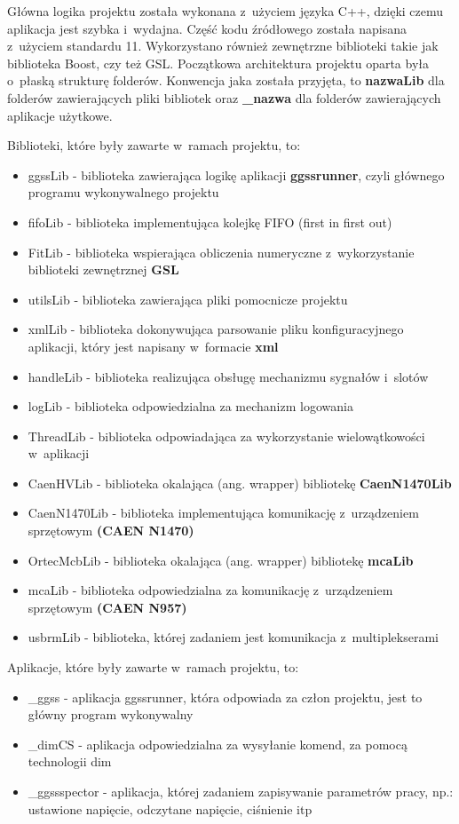 Główna logika projektu została wykonana z~użyciem języka C++, dzięki czemu aplikacja jest szybka i~wydajna. Część kodu źródłowego została napisana z~użyciem standardu 11. Wykorzystano również zewnętrzne biblioteki takie jak biblioteka Boost, czy też GSL. Początkowa architektura projektu oparta była o~płaską strukturę folderów. Konwencja jaka została przyjęta, to \textbf{nazwaLib} dla folderów zawierających pliki bibliotek oraz \textbf{\_nazwa} dla folderów zawierających aplikacje użytkowe.\par
\bigskip
Biblioteki, które były zawarte w~ramach projektu, to:
\begin{itemize}
\item ggssLib - biblioteka zawierająca logikę aplikacji \textbf{ggssrunner}, czyli głównego programu wykonywalnego projektu
\item fifoLib - biblioteka implementująca kolejkę FIFO (first in first out)
\item FitLib - biblioteka wspierająca obliczenia numeryczne z~wykorzystanie biblioteki zewnętrznej \textbf{GSL}
\item utilsLib - biblioteka zawierająca pliki pomocnicze projektu
\item xmlLib - biblioteka dokonywująca parsowanie pliku konfiguracyjnego aplikacji, który jest napisany w~formacie \textbf{xml}
\item handleLib - biblioteka realizująca obsługę mechanizmu sygnałów i~slotów
\item logLib - biblioteka odpowiedzialna za mechanizm logowania
\item ThreadLib - biblioteka odpowiadająca za wykorzystanie wielowątkowości w~aplikacji
\item CaenHVLib - biblioteka okalająca (ang. wrapper) bibliotekę \textbf{CaenN1470Lib}
\item CaenN1470Lib - biblioteka implementująca komunikację z~urządzeniem sprzętowym \textbf{(CAEN N1470)}
\item OrtecMcbLib - biblioteka okalająca (ang. wrapper) bibliotekę \textbf{mcaLib}
\item mcaLib - biblioteka odpowiedzialna za komunikację z~urządzeniem sprzętowym \textbf{(CAEN N957)}
\item usbrmLib - biblioteka, której zadaniem jest komunikacja z~multiplekserami
\end{itemize}

\par Aplikacje, które były zawarte w~ramach projektu, to:
\begin{itemize}
\item \_ggss - aplikacja ggssrunner, która odpowiada za człon projektu, jest to główny program wykonywalny
\item \_dimCS - aplikacja odpowiedzialna za wysyłanie komend, za pomocą technologii dim
\item \_ggssspector - aplikacja, której zadaniem zapisywanie parametrów pracy, np.: ustawione napięcie, odczytane napięcie, ciśnienie itp
\end{itemize}

